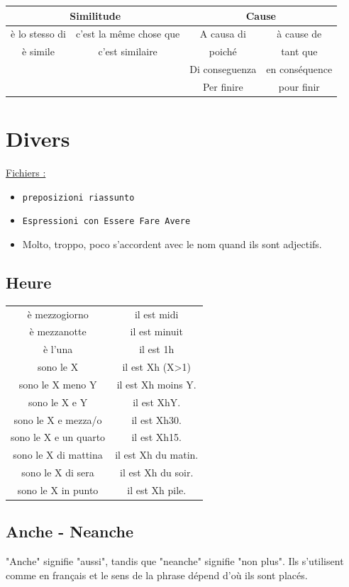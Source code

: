 \documentclass[12pt, openany]{report}
\begin{document}
\begin{center}
\begin{tabular}{|c|c|c|c|}
\multicolumn{2}{|c|}{Similitude} & \multicolumn{2}{c|}{Cause} \\ \hline
è lo stesso di & c'est la même chose que & A causa di & à cause de \\
è simile & c'est similaire & poiché & tant que \\ 
& & Di conseguenza & en conséquence \\
& & Per finire & pour finir \\ \hline
\end{tabular}
\end{center}

\chapter{Divers}
\underline{Fichiers :}
\begin{itemize}
    \item \texttt{preposizioni riassunto}
    \item \texttt{Espressioni con Essere Fare Avere}
    \item Molto, troppo, poco s'accordent avec le nom quand ils sont adjectifs. 
\end{itemize}
\section{Heure}
\begin{center}
    \begin{tabular}{c|c}
        è mezzogiorno  & il est midi\\
        è mezzanotte & il est minuit\\
        è l'una & il est 1h\\
        sono le X & il est Xh (X>1)\\
        sono le X meno Y & il est Xh moins Y.\\
        sono le X e Y & il est XhY.\\
        sono le X e mezza/o & il est Xh30.\\
        sono le X e un quarto & il est Xh15.\\
        sono le X di mattina & il est Xh du matin.\\
        sono le X di sera & il est Xh du soir.\\
        sono le X in punto & il est Xh pile.\\
    \end{tabular}
\end{center}
\section{Anche - Neanche}
"Anche" signifie "aussi", tandis que "neanche" signifie "non plus". Ils s'utilisent comme en français et le sens de la phrase dépend d'où ils sont placés. 
\end{document}
